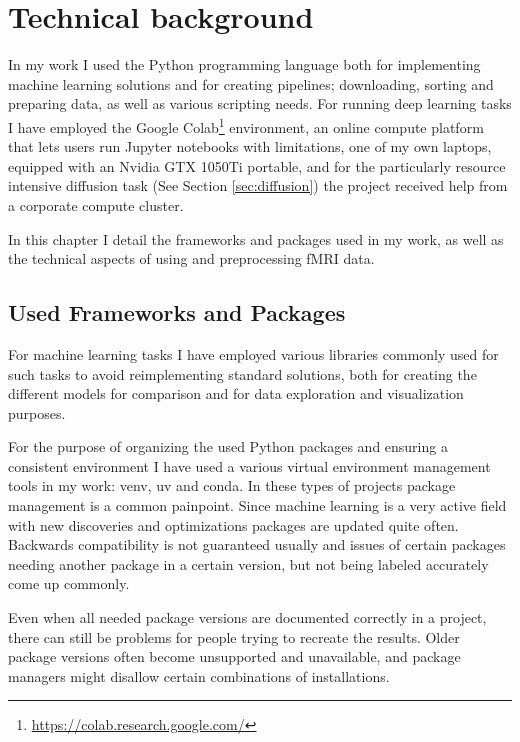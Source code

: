 \chapter{Technical background}

	In my work I used the Python programming language both for implementing machine learning solutions and for creating pipelines; downloading, sorting and preparing data, as well as various scripting needs. For running deep learning tasks I have employed the Google Colab\footnote{\url{https://colab.research.google.com/}} environment, an online compute platform that lets users run Jupyter notebooks with limitations, one of my own laptops, equipped with an Nvidia GTX 1050Ti portable, and for the particularly resource intensive diffusion task (See Section \ref{sec:diffusion}) the project received help from a corporate compute cluster.
	
	In this chapter I detail the frameworks and packages used in my work, as well as the technical aspects of using and preprocessing fMRI data. 

\section{Used Frameworks and Packages}

	For machine learning tasks I have employed various libraries commonly used for such tasks to avoid reimplementing standard solutions, both for creating the different models for comparison and for data exploration and visualization purposes.
	
	For the purpose of organizing the used Python packages and ensuring a consistent environment I have used a various virtual environment management tools in my work: venv, uv and conda. In these types of projects package management is a common painpoint. Since machine learning is a very active field with new discoveries and optimizations packages are updated quite often. Backwards compatibility is not guaranteed usually and issues of certain packages needing another package in a certain version, but not being labeled accurately come up commonly.
	
	Even when all needed package versions are documented correctly in a project, there can still be problems for people trying to recreate the results. Older package versions often become unsupported and unavailable, and package managers might disallow certain combinations of installations.


